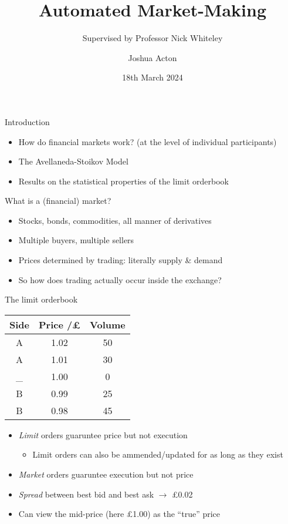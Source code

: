 \documentclass{beamer} %
\title{Automated Market-Making}
\author{Joshua Acton}
\date{18th March 2024}
\subtitle{Supervised by Professor Nick Whiteley}
\begin{document}
\begin{frame}
    \titlepage
\end{frame}

\begin{frame}{Introduction}
    \begin{itemize}
    \item How do financial markets work? (at the level of individual participants)
    \item The Avellaneda-Stoikov Model
    \item Results on the statistical properties of the limit orderbook
    \end{itemize}
\end{frame}

\begin{frame}{What is a (financial) market?}
    \begin{itemize}
        \item Stocks, bonds, commodities, all manner of derivatives
        \item Multiple buyers, multiple sellers
        \item Prices determined by trading: literally supply \& demand
        \item So how does trading actually occur inside the exchange?
    \end{itemize}
\end{frame}

\begin{frame}{The limit orderbook}
    \begin{center}
        \begin{tabular}{ |c|c|c| } 
            \hline
            Side & Price /£ & Volume \\ 
            \hline
            A & 1.02 & 50 \\
            A & 1.01 & 30 \\
            \_ & 1.00 & 0 \\
            B & 0.99 & 25 \\ 
            B & 0.98 & 45 \\
            \hline
        \end{tabular}
    \end{center}
    \begin{itemize}
        \item \emph{Limit} orders guaruntee price but not execution
        \begin{itemize}
            \item Limit orders can also be ammended/updated for as long as they exist
        \end{itemize}
        \item \emph{Market} orders guaruntee execution but not price
        \item \emph{Spread} between best bid and best ask $\rightarrow$ £0.02
        \item Can view the mid-price (here £1.00) as the ``true'' price
    \end{itemize}
\end{frame}
\end{document}
